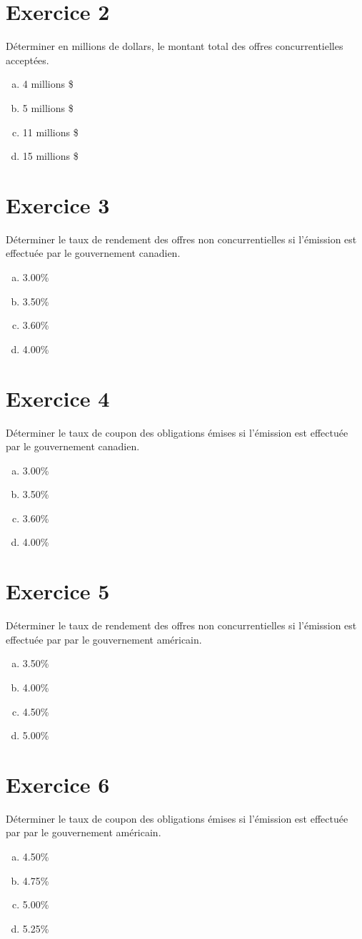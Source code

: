 \documentclass[10pt,a4paper]{article}
\begin{document}
\section*{Exercice 2}
Déterminer en millions de dollars,  le montant total des offres concurrentielles acceptées.

\begin{enumerate}[a)]
\item 4 millions \$
\item 5 millions \$
\item 11 millions \$
\item 15 millions \$
\end{enumerate}

\section*{Exercice 3}
Déterminer le taux de rendement des offres non concurrentielles si l'émission est effectuée par le gouvernement canadien.

\begin{enumerate}[a)]
\item 3.00\%
\item 3.50\%
\item 3.60\%
\item 4.00\%
\end{enumerate}

\section*{Exercice 4}
Déterminer le taux de coupon des obligations émises si l'émission est effectuée par le gouvernement canadien.

\begin{enumerate}[a)]
\item 3.00\%
\item 3.50\%
\item 3.60\%
\item 4.00\%
\end{enumerate}

\section*{Exercice 5}
Déterminer le taux de rendement des offres non concurrentielles si l'émission est effectuée par par le gouvernement américain.

\begin{enumerate}[a)]
\item 3.50\%
\item 4.00\%
\item 4.50\%
\item 5.00\%
\end{enumerate}

\section*{Exercice 6}
Déterminer le taux de coupon des obligations émises si l'émission est effectuée par par le gouvernement américain.

\begin{enumerate}[a)]
\item 4.50\%
\item 4.75\%
\item 5.00\%
\item 5.25\%
\end{enumerate}
\end{document}
